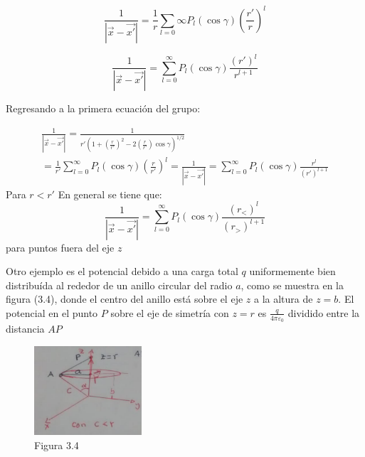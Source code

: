 \documentclass{article}
\begin{document}
\begin{equation}
     \frac{1}{|\vec{x} - \vec{x\prime}|} = \frac{1}{r} \sum_{l = 0}{\infty}P_l(\cos \gamma) \left( \frac{r\prime}{r} \right)^l
\end{equation}

\begin{equation}
 \frac{1}{|\vec{x} - \vec{x\prime}|} = \sum_{l=0}^{\infty} P_l(\cos\gamma) \frac{ (r\prime)^l}{r^{l+1}}    
\end{equation}

Regresando a la primera ecuación del grupo:

\begin{equation}
    \begin{gathered}
    \frac{1}{|\vec{x} - \vec{x\prime}|} = \frac{1}{r\prime \left(1 + \left( \frac{r}{r\prime} \right)^2 - 2 \left (\frac{r}{r\prime} \right )\cos \gamma \right)^{1/2} } \\
    = \frac{1}{r\prime} \sum_{l = 0}^{\infty} P_{l}(\cos \gamma) \left( \frac{r}{r\prime} \right )^l
    =     \frac{1}{|\vec{x} - \vec{x\prime}|} = \sum_{l = 0 }^{\infty} P_l(\cos \gamma) \frac{r^l}{(r\prime)^{l+1}}
    \end{gathered} 
\end{equation}
Para $r < r\prime$
En general se tiene que:
\begin{equation}
    \label{eq:3.38}
    \frac{1}{|\vec{x}-\vec{x\prime}|} = \sum_{l = 0}^{\infty} P_l(\cos \gamma) \frac{(r_<)^l}{(r_>)^{l+1}}
\end{equation}
para puntos fuera del eje $z$

Otro ejemplo es el potencial debido a una carga total $q$ uniformemente bien distribuída al rededor de un anillo circular del radio $a$, como se muestra en la figura (3.4), donde el centro del anillo está sobre el eje $z$ a la altura de $z = b$. El potencial en el punto $P$ sobre el eje de simetría con $z = r$ es $\frac{q}{4\pi \varepsilon_0}$ dividido entre la distancia $AP$


\begin{figure}[h]
\centering\includegraphics[width=4cm]{image3.png}
\caption{Figura 3.4}
\end{figure}
\end{document}
